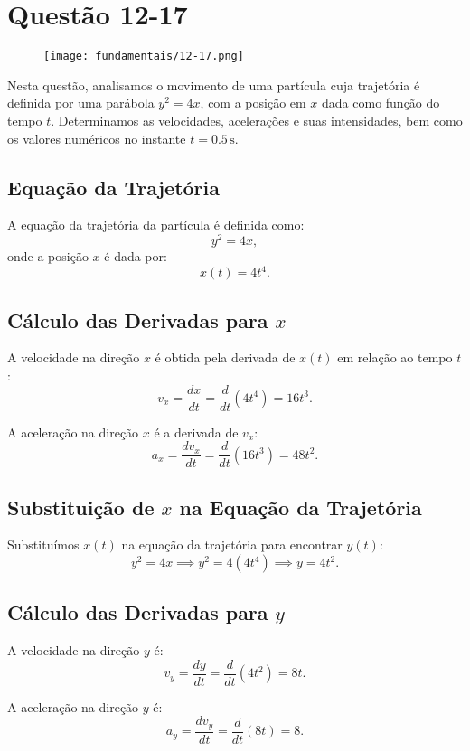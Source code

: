 \newpage
\section{Questão 12-17}

\begin{figure}[H]
	\centering
	\texttt{[image: fundamentais/12-17.png]}
\end{figure}

Nesta questão, analisamos o movimento de uma partícula cuja trajetória é definida por uma parábola \(y^2 = 4x\), com a posição em \(x\) dada como função do tempo \(t\). Determinamos as velocidades, acelerações e suas intensidades, bem como os valores numéricos no instante \(t = 0.5 \, \text{s}\).

\subsection*{Equação da Trajetória}
A equação da trajetória da partícula é definida como:
\[
y^2 = 4x,
\]
onde a posição \(x\) é dada por:
\[
x(t) = 4t^4.
\]

\subsection*{Cálculo das Derivadas para \(x\)}
A velocidade na direção \(x\) é obtida pela derivada de \(x(t)\) em relação ao tempo \(t\):
\[
v_x = \frac{dx}{dt} = \frac{d}{dt}\left(4t^4\right) = 16t^3.
\]

A aceleração na direção \(x\) é a derivada de \(v_x\):
\[
a_x = \frac{dv_x}{dt} = \frac{d}{dt}\left(16t^3\right) = 48t^2.
\]

\subsection*{Substituição de \(x\) na Equação da Trajetória}
Substituímos \(x(t)\) na equação da trajetória para encontrar \(y(t)\):
\[
y^2 = 4x \implies y^2 = 4(4t^4) \implies y = 4t^2.
\]

\subsection*{Cálculo das Derivadas para \(y\)}
A velocidade na direção \(y\) é:
\[
v_y = \frac{dy}{dt} = \frac{d}{dt}\left(4t^2\right) = 8t.
\]

A aceleração na direção \(y\) é:
\[
a_y = \frac{dv_y}{dt} = \frac{d}{dt}\left(8t\right) = 8.
\]

